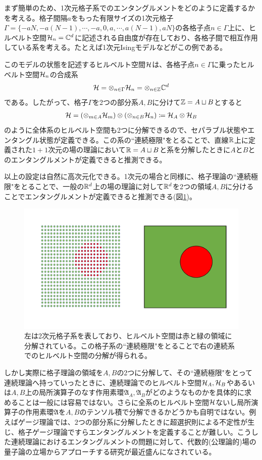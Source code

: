 まず簡単のため、1次元格子系でのエンタングルメントをどのように定義するかを考える。格子間隔$a$をもった有限サイズの1次元格子$\Gamma=\{-aN,-a(N-1),\cdots, -a,0,a,\cdots, a(N-1),aN\}$の各格子点$n\in\Gamma$上に、ヒルベルト空間$\mathcal{H}_n=\mathbb{C}^d$に記述される自由度が存在しており、各格子間で相互作用している系を考える。たとえば1次元Isingモデルなどがこの例である。

このモデルの状態を記述するヒルベルト空間$\mathcal{H}$は、各格子点$n\in\Gamma$に乗ったヒルベルト空間$\mathcal{H}_n$の合成系
\begin{align}
\mathcal{H}=\otimes_{n\in\Gamma} \mathcal{H}_n=\otimes_{n\in\mathbb{Z}} \mathbb{C}^d
\end{align}
である。したがって、格子$\Gamma$を2つの部分系$A,B$に分けて$\mathbb{Z}=A\sqcup B$とすると
\begin{align}
\mathcal{H}=\left( \otimes_{m\in A} \mathcal{H}_m \right) \otimes \left( \otimes_{n\in B} \mathcal{H}_n \right)\coloneqq \mathcal{H}_A\otimes \mathcal{H}_B
\end{align}
のように全体系のヒルベルト空間も2つに分解できるので、セパラブル状態やエンタングル状態が定義できる。この系の``連続極限"をとることで、直線$\mathbb{R}$上に定義された$1+1$次元の場の理論において$\mathbb{R}=A\sqcup B$と系を分解したときに$A$と$B$とのエンタングルメントが定義できると推測できる。

以上の設定は自然に高次元化できる。1次元の場合と同様に、格子理論の``連続極限"をとることで、一般の$\mathbb{R}^d$上の場の理論に対して$\mathbb{R}^d$を2つの領域$A,B$に分けることでエンタングルメントが定義できると推測できる(図\ref{fig:discreteentanglement})。
\begin{figure}[h]
	\centering
	\includegraphics[width=0.7\linewidth]{discreteEntanglement.pdf}
	\caption{左は2次元格子系を表しており、ヒルベルト空間は赤と緑の領域に分解されている。この格子系の``連続極限"をとることで右の連続系でのヒルベルト空間の分解が得られる。}
	\label{fig:discreteentanglement}
\end{figure}

しかし実際に格子理論の領域を$A,B$の2つに分解して、その``連続極限"をとって連続理論へ持っていったときに、連続理論でのヒルベルト空間$\mathcal{H}_A,\mathcal{H}_B$やあるいは$A,B$上の局所演算子のなす作用素環$\mathfrak{A}_A,\mathfrak{A}_B$がどのようなものかを具体的に求めることは一般には容易ではない。さらに全系のヒルベルト空間$\mathcal{H}$ないし局所演算子の作用素環$\mathfrak{A}$を$A,B$のテンソル積で分解できるかどうかも自明ではない。例えばゲージ理論では、$2$つの部分系に分解したときに超選択則による不定性が生じ、格子ゲージ理論ですらエンタングルメントを定義することが難しい\cite{Radicevic:2014kqa}\cite{Casini:2013rba}\cite{Aoki_2017}。こうした連続理論におけるエンタングルメントの問題に対して、代数的(公理論的)場の量子論の立場からアプローチする研究が最近盛んになされている\cite{hollands2018entanglement}\cite{Witten_2018}。

